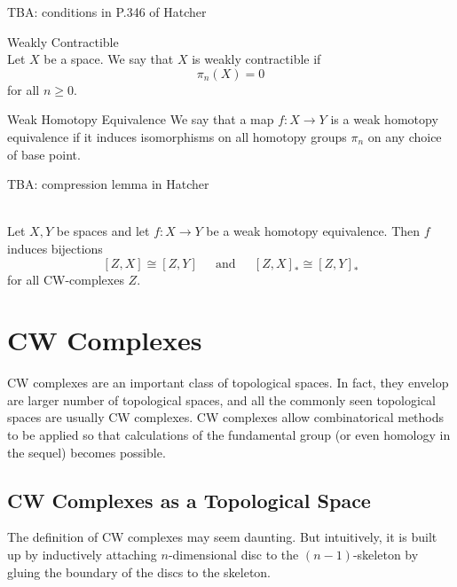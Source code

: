\documentclass[a4paper]{article}
\begin{document}
TBA: conditions in P.346 of Hatcher

\begin{defn}{Weakly Contractible}{}\\
Let $X$ be a space. We say that $X$ is weakly contractible if $$\pi_n(X)=0$$ for all $n\geq 0$. 
\end{defn}

\begin{defn}{Weak Homotopy Equivalence}{} We say that a map $f:X\to Y$ is a weak homotopy equivalence if it induces isomorphisms on all homotopy groups $\pi_n$ on any choice of base point. 
\end{defn}

TBA: compression lemma in Hatcher

\begin{prp}{}{}\\
Let $X,Y$ be spaces and let $f:X\to Y$ be a weak homotopy equivalence. Then $f$ induces bijections $$[Z,X]\cong[Z,Y]\;\;\;\;\text{ and }\;\;\;\;[Z,X]_\ast\cong[Z,Y]_\ast$$ for all CW-complexes $Z$. 
\end{prp}

\pagebreak
\section{CW Complexes}
CW complexes are an important class of topological spaces. In fact, they envelop are larger number of topological spaces, and all the commonly seen topological spaces are usually CW complexes. CW complexes allow combinatorical methods to be applied so that calculations of the fundamental group (or even homology in the sequel) becomes possible. 

\subsection{CW Complexes as a Topological Space}
The definition of CW complexes may seem daunting. But intuitively, it is built up by inductively attaching $n$-dimensional disc to the $(n-1)$-skeleton by gluing the boundary of the discs to the skeleton. 
\end{document}
